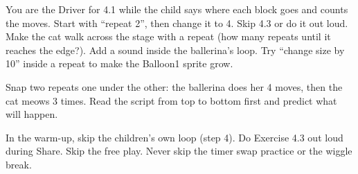 \begin{differentiation}
\supportpath You are the Driver for 4.1 while the child says where each block goes and counts the moves. Start with \enquote{repeat 2}, then change it to 4. Skip 4.3 or do it out loud.
\extensionpath Make the cat walk across the stage with a repeat (how many repeats until it reaches the edge?). Add a sound inside the ballerina's loop. Try \enquote{change size by 10} inside a repeat to make the Balloon1 sprite grow.
\end{differentiation}

\begin{stretchchallenge}
Snap two repeats one under the other: the ballerina does her 4 moves, then the cat meows 3 times. Read the script from top to bottom first and predict what will happen.
\end{stretchchallenge}

\begin{teachernote}
In the warm-up, skip the children's own loop (step 4). Do Exercise 4.3 out loud during Share. Skip the free play. Never skip the timer swap practice or the wiggle break.
\end{teachernote}
